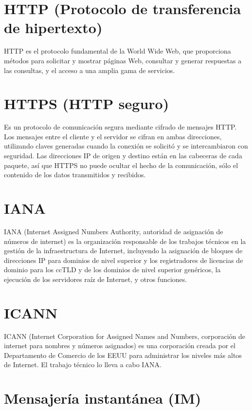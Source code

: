 \documentclass[10pt,a5paper,twoside,,]{book}
\begin{document}
\section{HTTP (Protocolo de transferencia de
hipertexto)}\label{http-protocolo-de-transferencia-de-hipertexto}

HTTP es el protocolo fundamental de la World Wide Web, que proporciona
métodos para solicitar y mostrar páginas Web, consultar y generar
respuestas a las consultas, y el acceso a una amplia gama de servicios.

\section{HTTPS (HTTP seguro)}\label{https-http-seguro}

Es un protocolo de comunicación segura mediante cifrado de mensajes
HTTP. Los mensajes entre el cliente y el servidor se cifran en ambas
direcciones, utilizando claves generadas cuando la conexión se solicitó
y se intercambiaron con seguridad. Las direcciones IP de origen y
destino están en las cabeceras de cada paquete, así que HTTPS no puede
ocultar el hecho de la comunicación, sólo el contenido de los datos
transmitidos y recibidos.

\section{IANA}\label{iana}

IANA (Internet Assigned Numbers Authority, autoridad de asignación de
números de internet) es la organización responsable de los trabajos
técnicos en la gestión de la infraestructura de Internet, incluyendo la
asignación de bloques de direcciones IP para dominios de nivel superior
y los registradores de licencias de dominio para los ccTLD y de los
dominios de nivel superior genéricos, la ejecución de los servidores
raíz de Internet, y otros funciones.

\section{ICANN}\label{icann}

ICANN (Internet Corporation for Assigned Names and Numbers, corporación
de internet para nombres y números asignados) es una corporación creada
por el Departamento de Comercio de los EEUU para administrar los niveles
más altos de Internet. El trabajo técnico lo lleva a cabo IANA.

\section{Mensajería instantánea
(IM)}\label{mensajeruxeda-instantuxe1nea-im}
\end{document}
